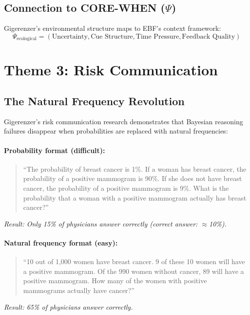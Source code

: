 \subsection{Connection to CORE-WHEN ($\Psi$)}

Gigerenzer's environmental structure maps to EBF's context framework:
\begin{equation}
\Psi_{\text{ecological}} = (\text{Uncertainty}, \text{Cue Structure}, \text{Time Pressure}, \text{Feedback Quality})
\end{equation}


\section{Theme 3: Risk Communication}
\label{sec:gi-risk}

\subsection{The Natural Frequency Revolution}

Gigerenzer's risk communication research \citep{gigerenzer1995improve, gigerenzer2007helping} demonstrates that Bayesian reasoning failures disappear when probabilities are replaced with natural frequencies:

\paragraph{Probability format (difficult):}
\begin{quote}
``The probability of breast cancer is 1\%. If a woman has breast cancer, the probability of a positive mammogram is 90\%. If she does not have breast cancer, the probability of a positive mammogram is 9\%. What is the probability that a woman with a positive mammogram actually has breast cancer?''
\end{quote}
\textit{Result: Only 15\% of physicians answer correctly (correct answer: $\approx$10\%).}

\paragraph{Natural frequency format (easy):}
\begin{quote}
``10 out of 1,000 women have breast cancer. 9 of these 10 women will have a positive mammogram. Of the 990 women without cancer, 89 will have a positive mammogram. How many of the women with positive mammograms actually have cancer?''
\end{quote}
\textit{Result: 65\% of physicians answer correctly.}

